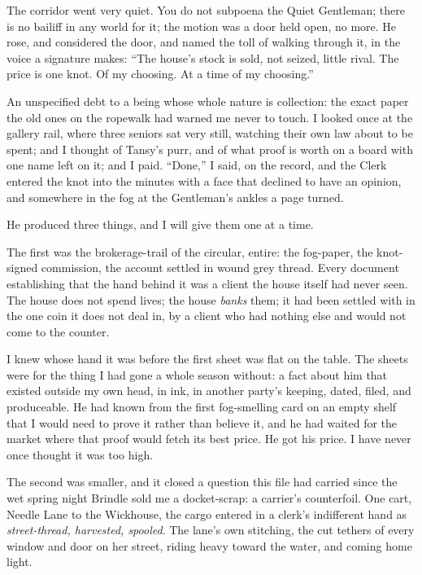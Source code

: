 The corridor went very quiet. You do not subpoena the Quiet Gentleman; there is no bailiff in any world for it; the motion was a door held open, no more. He rose, and considered the door, and named the toll of walking through it, in the voice a signature makes: ``The house's stock is sold, not seized, little rival. The price is one knot. Of my choosing. At a time of my choosing.''

An unspecified debt to a being whose whole nature is collection: the exact paper the old ones on the ropewalk had warned me never to touch. I looked once at the gallery rail, where three seniors sat very still, watching their own law about to be spent; and I thought of Tansy's purr, and of what proof is worth on a board with one name left on it; and I paid. ``Done,'' I said, on the record, and the Clerk entered the knot into the minutes with a face that declined to have an opinion, and somewhere in the fog at the Gentleman's ankles a page turned.

He produced three things, and I will give them one at a time.

The first was the brokerage-trail of the circular, entire: the fog-paper, the knot-signed commission, the account settled in wound grey thread. Every document establishing that the hand behind it was a client the house itself had never seen. The house does not spend lives; the house \emph{banks} them; it had been settled with in the one coin it does not deal in, by a client who had nothing else and would not come to the counter.

I knew whose hand it was before the first sheet was flat on the table. The sheets were for the thing I had gone a whole season without: a fact about him that existed outside my own head, in ink, in another party's keeping, dated, filed, and produceable. He had known from the first fog-smelling card on an empty shelf that I would need to prove it rather than believe it, and he had waited for the market where that proof would fetch its best price. He got his price. I have never once thought it was too high.

The second was smaller, and it closed a question this file had carried since the wet spring night Brindle sold me a docket-scrap: a carrier's counterfoil. One cart, Needle Lane to the Wickhouse, the cargo entered in a clerk's indifferent hand as \emph{street-thread, harvested, spooled}. The lane's own stitching, the cut tethers of every window and door on her street, riding heavy toward the water, and coming home light.

